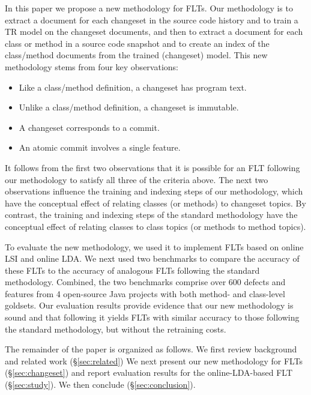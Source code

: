 In this paper we propose a new methodology for FLTs. Our methodology is to
extract a document for each changeset in the source code history and to train a
TR model on the changeset documents, and then to extract a document for each
class or method in a source code snapshot and to create an index of the
class/method documents from the trained (changeset) model. This new methodology
stems from four key observations:
\begin{itemize}[leftmargin=*]
  \item
    Like a class/method definition, a changeset has program text.
  \item
    Unlike a class/method definition, a changeset is immutable.
  \item
    A changeset corresponds to a commit.
  \item
    An atomic commit involves a single feature.
\end{itemize}
It follows from the first two observations that it is possible for an FLT
following our methodology to satisfy all three of the criteria above. The next
two observations influence the training and indexing steps of our methodology,
which have the conceptual effect of relating classes (or methods) to changeset
topics. By contrast, the training and indexing steps of the standard methodology
have the conceptual effect of relating classes to class topics (or methods to
method topics).

To evaluate the new methodology, we used it to implement FLTs based on online
LSI and online LDA. We next used two benchmarks to compare the accuracy of these
FLTs to the accuracy of analogous FLTs following the standard methodology.
Combined, the two benchmarks comprise over 600 defects and features from 4
open-source Java projects with both method- and class-level goldsets. Our
evaluation results provide evidence that our new methodology is sound and that
following it yields FLTs with similar accuracy to those following the standard
methodology, but without the retraining costs.

The remainder of the paper is organized as follows. We first review background
and related work (\S\ref{sec:related}) We next present our new methodology for
FLTs (\S\ref{sec:changeset}) and report evaluation results for the
online-LDA-based FLT (\S\ref{sec:study}). We then conclude
(\S\ref{sec:conclusion}).
